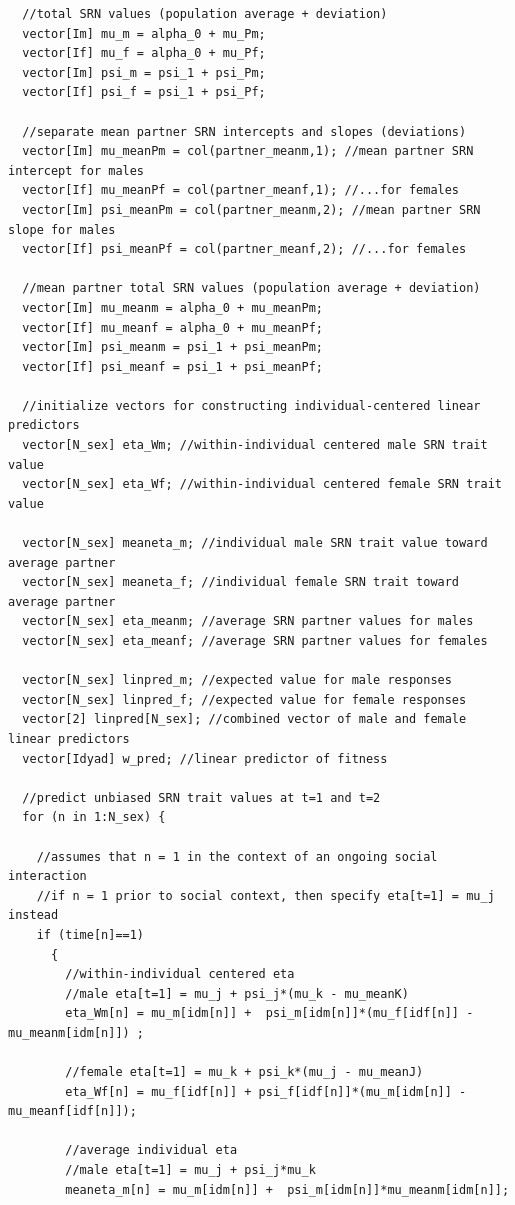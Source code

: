 \documentclass[
]{book}
\begin{document}
\begin{verbatim}
  //total SRN values (population average + deviation)
  vector[Im] mu_m = alpha_0 + mu_Pm;
  vector[If] mu_f = alpha_0 + mu_Pf; 
  vector[Im] psi_m = psi_1 + psi_Pm; 
  vector[If] psi_f = psi_1 + psi_Pf; 
  
  //separate mean partner SRN intercepts and slopes (deviations)
  vector[Im] mu_meanPm = col(partner_meanm,1); //mean partner SRN intercept for males
  vector[If] mu_meanPf = col(partner_meanf,1); //...for females
  vector[Im] psi_meanPm = col(partner_meanm,2); //mean partner SRN slope for males
  vector[If] psi_meanPf = col(partner_meanf,2); //...for females
  
  //mean partner total SRN values (population average + deviation)
  vector[Im] mu_meanm = alpha_0 + mu_meanPm;
  vector[If] mu_meanf = alpha_0 + mu_meanPf;
  vector[Im] psi_meanm = psi_1 + psi_meanPm; 
  vector[If] psi_meanf = psi_1 + psi_meanPf; 
  
  //initialize vectors for constructing individual-centered linear predictors
  vector[N_sex] eta_Wm; //within-individual centered male SRN trait value 
  vector[N_sex] eta_Wf; //within-individual centered female SRN trait value
  
  vector[N_sex] meaneta_m; //individual male SRN trait value toward average partner 
  vector[N_sex] meaneta_f; //individual female SRN trait toward average partner
  vector[N_sex] eta_meanm; //average SRN partner values for males
  vector[N_sex] eta_meanf; //average SRN partner values for females
  
  vector[N_sex] linpred_m; //expected value for male responses
  vector[N_sex] linpred_f; //expected value for female responses
  vector[2] linpred[N_sex]; //combined vector of male and female linear predictors
  vector[Idyad] w_pred; //linear predictor of fitness
  
  //predict unbiased SRN trait values at t=1 and t=2
  for (n in 1:N_sex) {
    
    //assumes that n = 1 in the context of an ongoing social interaction
    //if n = 1 prior to social context, then specify eta[t=1] = mu_j instead
    if (time[n]==1)
      {
        //within-individual centered eta
        //male eta[t=1] = mu_j + psi_j*(mu_k - mu_meanK)
        eta_Wm[n] = mu_m[idm[n]] +  psi_m[idm[n]]*(mu_f[idf[n]] - mu_meanm[idm[n]]) ;
        
        //female eta[t=1] = mu_k + psi_k*(mu_j - mu_meanJ)
        eta_Wf[n] = mu_f[idf[n]] + psi_f[idf[n]]*(mu_m[idm[n]] - mu_meanf[idf[n]]);
        
        //average individual eta
        //male eta[t=1] = mu_j + psi_j*mu_k
        meaneta_m[n] = mu_m[idm[n]] +  psi_m[idm[n]]*mu_meanm[idm[n]];
        

\end{verbatim}
\end{document}
